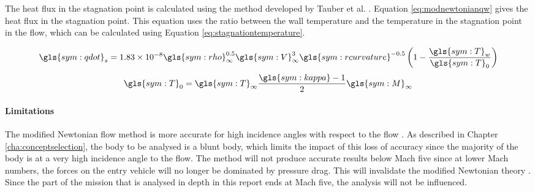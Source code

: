 The heat flux in the stagnation point is calculated using the method developed by Tauber et al. \cite{Tauber1986}. Equation \ref{eq:modnewtonianqw} gives the heat flux in the stagnation point. This equation uses the ratio between the wall temperature and the temperature in the stagnation point in the flow, which can be calculated using Equation \ref{eq:stagnationtemperature}\cite{AndersonJr.2006}.


	\begin{equation} \label{eq:modnewtonianqw}
		\gls{sym:qdot}_{s} = 1.83 \times 10^{-8} \gls{sym:rho}_{\infty}^{0.5} \gls{sym:V}_{\infty}^3  \gls{sym:rcurvature}^{-0.5} \left(1-\frac{\gls{sym:T}_{w}}{\gls{sym:T}_0}\right)
	\end{equation} \break
	\begin{equation}
		\gls{sym:T}_0 = \gls{sym:T}_\infty \frac{\gls{sym:kappa}-1}{2}\gls{sym:M}_\infty
		\label{eq:stagnationtemperature}
	\end{equation}
	


\paragraph{Limitations}
The modified Newtonian flow method is more accurate for high incidence angles with respect to the flow \cite{AndersonJr.2006}. As described in Chapter \ref{cha:conceptselection}, the body to be analysed is a blunt body, which limits the impact of this loss of accuracy since the majority of the body is at a very high incidence angle to the flow. The method will not produce accurate results below Mach five since at lower Mach numbers, the forces on the entry vehicle will no longer be dominated by pressure drag. This will invalidate the modified Newtonian theory \cite{AndersonJr.2006}.
Since the part of the mission that is analysed in depth in this report ends at Mach five, the analysis will not be influenced.

